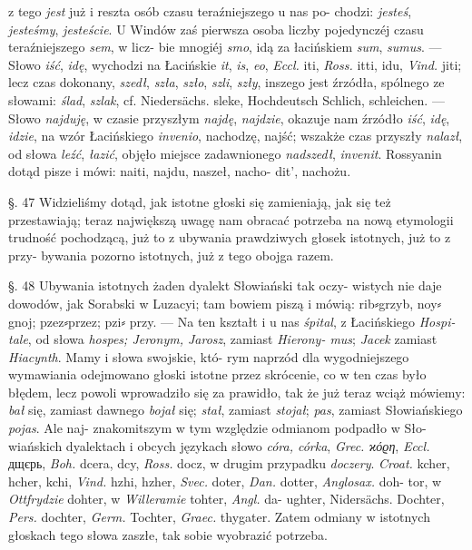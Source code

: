 
z tego \textit{jest} już i reszta osób czasu teraźniejszego u nas po-
chodzi: \textit{jesteś}, \textit{jesteśmy}, \textit{jesteście}. U Windów zaś pierwsza
osoba liczby pojedynczéj czasu teraźniejszego \textit{sem}, w licz-
bie mnogiéj \textit{smo}, idą za łacińskiem \textit{sum}, \textit{sumus}. — Słowo
\textit{iść}, \textit{idę}, wychodzi na Łacińskie \textit{it}, \textit{is}, \textit{eo}, \textit{Eccl.} iti, \textit{Ross.}
itti, idu, \textit{Vind.} jiti; lecz czas dokonany, \textit{szedł}, \textit{szła}, \textit{szło},
\textit{szli}, \textit{szły}, inszego jest źrzódła, spólnego ze słowami: \textit{ślad},
\textit{szlak}, cf. \textsf{Niedersächs. sleke, Hochdeutsch Schlich, schleichen.} —
Słowo \textit{najduję}, w czasie przyszłym \textit{najdę}, \textit{najdzie}, okazuje
nam źrzódło \textit{iść}, \textit{idę}, \textit{idzie}, na wzór Łacińskiego \textit{invenio},
nachodzę, najść; wszakże czas przyszły \textit{nalazł}, od słowa
\textit{leźć}, \textit{łazić}, objęło miejsce zadawnionego \textit{nadszedł}, \textit{invenit}.
Rossyanin dotąd pisze i mówi: naiti, najdu, naszeł, nacho-
dit', nachożu.

§⃔. 47
Widzieliśmy dotąd, jak istotne głoski się zamieniają, jak
się też przestawiają; teraz największą uwagę nam obracać
potrzeba na nową etymologii trudność pochodzącą, już to
z ubywania prawdziwych głosek istotnych, już to z przy-
bywania pozorno istotnych, już z tego obojga razem.

§⃔. 48
Ubywania istotnych żaden dyalekt Słowiański tak oczy-
wistych nie daje dowodów, jak Sorabski w Luzacyi; tam
bowiem piszą i mówią: rib⸗grzyb, noy⸗gnoj; pzez⸗przez; pzi⸗
przy. — Na ten kształt i u nas \textit{śpital}, z Łacińskiego \textit{Hospi-
tale}, od słowa \textit{hospes; Jeronym, Jarosz}, zamiast \textit{Hierony-
mus}; \textit{Jacek} zamiast \textit{Hiacynth}. Mamy i słowa swojskie, któ-
rym naprzód dla wygodniejszego wymawiania odejmowano
głoski istotne przez skrócenie, co w ten czas było błędem,
lecz powoli wprowadziło się za prawidło, tak że już teraz
wciąż mówiemy: \textit{bał} się, zamiast dawnego \textit{bojał} się; \textit{stał},
zamiast \textit{stojał}; \textit{pas}, zamiast Słowiańskiego \textit{pojas}. Ale naj-
znakomitszym w tym względzie odmianom podpadło w Sło-
wiańskich dyalektach i obcych językach słowo \textit{córa, córka},
\textit{Grec. ϰόϱη}, \textit{Eccl.} дщєрь, \textit{Boh.} dcera, dcy, \textit{Ross.} docz,
w drugim przypadku \textit{doczery}. \textit{Croat.} kcher, hcher, kchi,
\textit{Vind.} hzhi, hzher, \textit{Svec.} doter, \textit{Dan.} dotter, \textit{Anglosax.} doh-
tor, w \textit{Ottfrydzie} dohter, w \textit{Willeramie} tohter, \textit{Angl.} da-
ughter, \textsf{Nidersächs. Dochter}, \textit{Pers.} dochter, \textit{Germ.} \textsf{Tochter},
\textit{Graec.} thygater. Zatem odmiany w istotnych głoskach tego
słowa zaszłe, tak sobie wyobrazić potrzeba.

